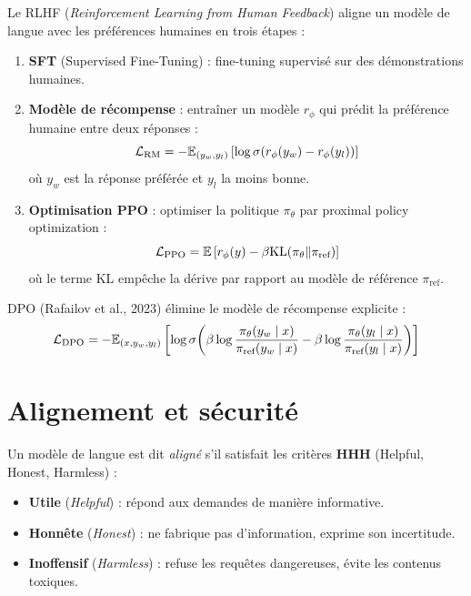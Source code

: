 \begin{definition}[RLHF]
Le RLHF (\emph{Reinforcement Learning from Human Feedback}) aligne un mod\`ele
de langue avec les pr\'ef\'erences humaines en trois \'etapes :
\begin{enumerate}
    \item \textbf{SFT} (Supervised Fine-Tuning) : fine-tuning supervis\'e sur
          des d\'emonstrations humaines.
    \item \textbf{Mod\`ele de r\'ecompense} : entra\^iner un mod\`ele $r_\phi$
          qui pr\'edit la pr\'ef\'erence humaine entre deux r\'eponses :
          \[
          \mathcal{L}_{\text{RM}} = -\mathbb{E}_{(y_w, y_l)}\left[\log \sigma(r_\phi(y_w) - r_\phi(y_l))\right]
          \]
          o\`u $y_w$ est la r\'eponse pr\'ef\'er\'ee et $y_l$ la moins bonne.
    \item \textbf{Optimisation PPO} : optimiser la politique $\pi_\theta$ par
          proximal policy optimization :
          \[
          \mathcal{L}_{\text{PPO}} = \mathbb{E}\left[r_\phi(y) - \beta \mathrm{KL}(\pi_\theta \| \pi_{\text{ref}})\right]
          \]
          o\`u le terme KL emp\^eche la d\'erive par rapport au mod\`ele de
          r\'ef\'erence $\pi_{\text{ref}}$.
\end{enumerate}
\end{definition}

\begin{formules}[title=\textbf{Objectif DPO (Direct Preference Optimization)}]
DPO (Rafailov et al., 2023) \'elimine le mod\`ele de r\'ecompense explicite :
\[
\mathcal{L}_{\text{DPO}} = -\mathbb{E}_{(x, y_w, y_l)}\left[\log \sigma\!\left(\beta \log \frac{\pi_\theta(y_w \mid x)}{\pi_{\text{ref}}(y_w \mid x)} - \beta \log \frac{\pi_\theta(y_l \mid x)}{\pi_{\text{ref}}(y_l \mid x)}\right)\right]
\]
\end{formules}

\section{Alignement et s\'ecurit\'e}
\label{sec:ft:alignement}

\begin{definition}
Un mod\`ele de langue est dit \emph{align\'e} s'il satisfait les crit\`eres
\textbf{HHH} (Helpful, Honest, Harmless) :
\begin{itemize}
    \item \textbf{Utile} (\emph{Helpful}) : r\'epond aux demandes de mani\`ere
          informative.
    \item \textbf{Honn\^ete} (\emph{Honest}) : ne fabrique pas d'information,
          exprime son incertitude.
    \item \textbf{Inoffensif} (\emph{Harmless}) : refuse les requ\^etes
          dangereuses, \'evite les contenus toxiques.
\end{itemize}
\end{definition}

